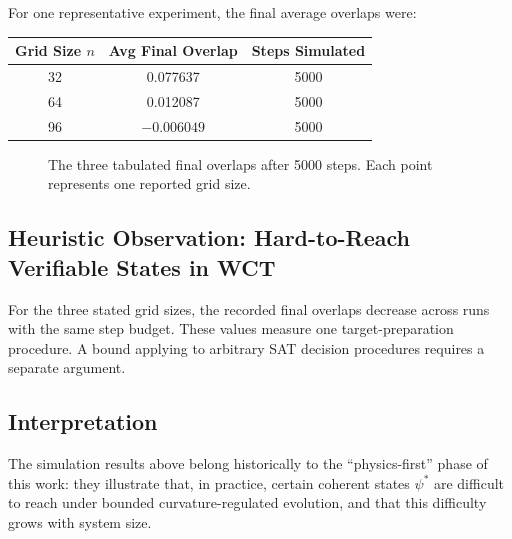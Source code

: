 \documentclass[12pt]{article}
\theoremstyle{remark}
\begin{document}
For one representative experiment, the final average overlaps were:
\begin{center}
\begin{tabular}{|c|c|c|}
\hline
\textbf{Grid Size \( n \)} & \textbf{Avg Final Overlap} & \textbf{Steps Simulated} \\
\hline
32 & 0.077637  & 5000 \\[2pt]
64 & 0.012087  & 5000 \\[2pt]
96 & $-0.006049$ & 5000 \\
\hline
\end{tabular}
\end{center}

\begin{figure}[h]
  \centering
{}
  \caption{The three tabulated final overlaps after 5000 steps. Each point
  represents one reported grid size.}

\end{figure}

\subsection{Heuristic Observation: Hard-to-Reach Verifiable States in WCT}

For the three stated grid sizes, the recorded final overlaps decrease
across runs with the same step budget. These values measure one
target-preparation procedure. A bound applying to arbitrary SAT
decision procedures requires a separate argument.

\subsection{Interpretation}

The simulation results above belong historically to the “physics-first” phase
of this work: they illustrate that, in practice, certain coherent states
\( \psi^* \) are difficult to reach under bounded curvature-regulated evolution,
and that this difficulty grows with system size.
\end{document}
